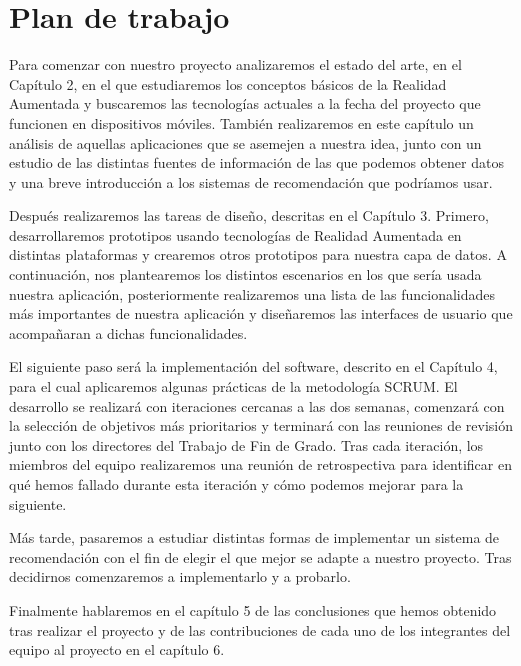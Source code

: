\section{Plan de trabajo}
\begin{flushleft}
    Para comenzar con nuestro proyecto analizaremos el estado del arte, en el Capítulo 2, en el que estudiaremos los conceptos
     básicos de la Realidad Aumentada y buscaremos las tecnologías actuales a la fecha del proyecto
     que funcionen en dispositivos móviles. También realizaremos en este capítulo un análisis de aquellas aplicaciones que se asemejen
     a nuestra idea, junto con un estudio de las distintas fuentes de información de las que podemos obtener datos y una breve introducción
    a los sistemas de recomendación que podríamos usar.
\end{flushleft}

\begin{flushleft}     
    Después realizaremos las tareas de diseño, descritas en el Capítulo 3. Primero,
    desarrollaremos prototipos usando tecnologías de Realidad Aumentada en distintas plataformas y crearemos otros prototipos para nuestra capa de datos. 
    A continuación, nos plantearemos los distintos
    escenarios en los que sería usada nuestra aplicación, posteriormente realizaremos una lista de las funcionalidades 
    más importantes de nuestra aplicación y diseñaremos las interfaces de usuario que acompañaran a dichas funcionalidades. 
\end{flushleft}

\begin{flushleft}    
    El siguiente paso será la implementación del software, descrito en el Capítulo 4, para el cual aplicaremos
     algunas prácticas de la metodología SCRUM. El desarrollo se realizará
     con iteraciones cercanas a las dos semanas, comenzará con la selección de
     objetivos más prioritarios y terminará con las reuniones de revisión junto
     con los directores del Trabajo de Fin de Grado. Tras cada iteración, los miembros del equipo 
     realizaremos una reunión de retrospectiva para identificar en qué hemos fallado durante esta iteración y
     cómo podemos mejorar para la siguiente.
\end{flushleft}

\begin{flushleft}
    Más tarde, pasaremos a estudiar distintas formas de implementar un sistema
     de recomendación con el fin de elegir el que mejor se adapte a nuestro proyecto. Tras
     decidirnos comenzaremos a implementarlo y a probarlo.
\end{flushleft}

\begin{flushleft}
Finalmente hablaremos en el capítulo 5 de las conclusiones que hemos obtenido tras realizar el proyecto y 
de las contribuciones de cada uno de los integrantes del equipo al proyecto en el capítulo 6.
\end{flushleft}
\label{makereference1.3}



